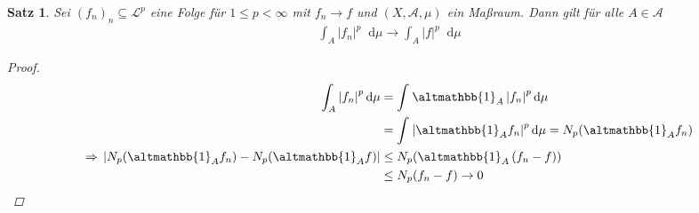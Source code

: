 \documentclass[11pt, twoside, a4paper]{article}
\theoremstyle{plain}
\newtheorem{satz}[blockelement]{Satz}
\numberwithin{equation}{subsection}
\newcommand{\pair}[1]{\left(#1\right)}
\newcommand{\of}[1]{\mathopen{}\mathclose{}\bgroup\left(#1\aftergroup\egroup\right)}
\newcommand{\abs}[1]{\left\lvert#1\right\rvert}
\newcommand{\impl}[0]{\Rightarrow{}}
\newcommand{\dif}{\mathop{}\!\mathrm{d}}
\newcommand{\charfunc}{\altmathbb{1}}
\newcommand{\mA}{\mathcal{A}}
\newcommand{\mL}{\mathcal{L}}
\begin{document}
    \begin{satz}
        \marginnote{[24. Jan]}
        Sei $(f_n)_n \subseteq \mL^p$ eine Folge für $1\leq p < \infty$ mit $f_n \to f$ und $\pair{X, \mA, \mu}$ ein Maßraum. Dann gilt für alle $A \in\mA$
        \begin{align*}
            \int_{A}^{} \abs{f_n}^p \dif \mu \to \int_{A}^{} \abs{f}^p \dif \mu
        \end{align*}
        \begin{proof}
            \begin{align*}
                \int_{A}^{} \abs{f_n}^p \dif \mu &= \int_{}^{} \charfunc_{A} \abs{f_n}^p \dif \mu\\
                &= \int_{}^{} \abs{\charfunc_A f_n}^p \dif \mu = N_p\of{\charfunc_{A} f_n}\\
                \impl \abs{N_p\of{\charfunc_A f_n} - N_p\of{\charfunc_A f}} &\leq N_p\of{\charfunc_{A}\pair{f_n - f}}\\
                &\leq N_p\of{f_n - f} \to 0\qedhere
            \end{align*}
        \end{proof}
    \end{satz}
\end{document}
